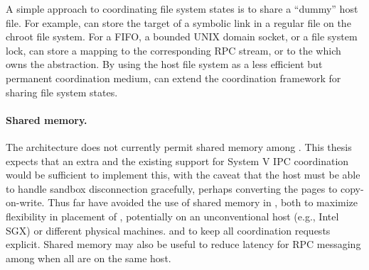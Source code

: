 
A simple approach to coordinating file system states is to share a ``dummy'' host file.
For example,  \thelibos{} can store the target of a symbolic link
in a regular file on the chroot file system.
For a FIFO, a bounded UNIX domain socket, or a file system lock,
\thelibos{} can store a mapping to the corresponding RPC stream, or to the \picoproc{} which owns the abstraction.
By using the host file system as a less efficient but permanent coordination medium,
\thelibos{} can extend the coordination framework for sharing file system states.



\paragraph{Shared memory.} The \graphene{} architecture 
does not currently permit shared memory among \picoprocs{}.
This thesis expects that an extra \hostapi{} and the existing support for System V IPC coordination would be sufficient to implement this,
with the caveat that the host must be able to handle sandbox disconnection gracefully, perhaps converting the pages to copy-on-write.
Thus far \graphene{} have avoided the use of shared memory in \thelibos{},
both to maximize flexibility in placement of \picoprocs{}, potentially on an unconventional host (e.g., Intel SGX) or different physical machines.
and to keep all coordination requests explicit.
Shared memory may also be useful to reduce latency for RPC messaging among \picoprocs{} when 
all \picoprocs{} are on the same host.



 


